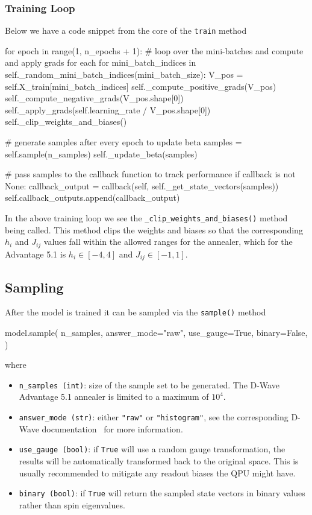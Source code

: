 \subsubsection{Training Loop}
Below we have a code snippet from the core of the \texttt{train} method
\begin{python}[breaklines=true]
for epoch in range(1, n_epochs + 1):
    # loop over the mini-batches and compute and apply grads for each
    for mini_batch_indices in self._random_mini_batch_indices(mini_batch_size):
        V_pos = self.X_train[mini_batch_indices]
        self._compute_positive_grads(V_pos)
        self._compute_negative_grads(V_pos.shape[0])
        self._apply_grads(self.learning_rate / V_pos.shape[0])
        self._clip_weights_and_biases()

    # generate samples after every epoch to update beta
    samples = self.sample(n_samples)
    self._update_beta(samples)

    # pass samples to the callback function to track performance
    if callback is not None:
        callback_output = callback(self, self._get_state_vectors(samples))
        self.callback_outputs.append(callback_output)
\end{python}
In the above training loop we see the \texttt{\_clip\_weights\_and\_biases()} method being called.
This method clips the weights and biases so that the corresponding \( h_i \) and \( J_{ij} \) values fall within the allowed ranges for the annealer, which for the Advantage 5.1 is \( h_i \in [-4, 4] \) and \( J_{ij} \in [-1, 1] \).

\subsection{Sampling}
After the model is trained it can be sampled via the \texttt{sample()} method
\begin{python}
model.sample(
    n_samples,
    answer_mode="raw",
    use_gauge=True,
    binary=False,
)
\end{python}
where
\begin{itemize}
    \item \texttt{n\_samples (int)}: size of the sample set to be generated. The D-Wave Advantage 5.1 annealer is limited to a maximum of \( 10^4 \).
    \item \texttt{answer\_mode (str)}: either \texttt{"raw"} or \texttt{"histogram"}, see the corresponding D-Wave documentation~\cite{dwave_solver_parameters} for more information.
    \item \texttt{use\_gauge (bool)}: if \texttt{True} will use a random gauge transformation, the results will be automatically transformed back to the original space. This is usually recommended to mitigate any readout biases the QPU might have.
    \item \texttt{binary (bool)}: if \texttt{True} will return the sampled state vectors in binary values rather than spin eigenvalues.
\end{itemize}

